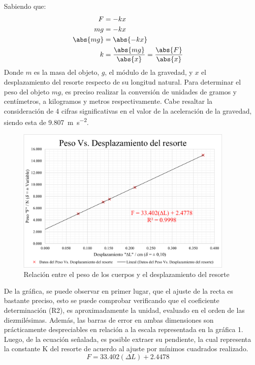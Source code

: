 \documentclass[../main.tex]{subfiles}
\begin{document}
Sabiendo que:
\begin{align*}
  F &= -kx \\
  mg &= -kx \\
  \abs{mg} &= \abs{-kx} \\
  k &= \frac{\abs{mg}}{\abs{x}} = \frac{\abs{F}}{\abs{x}}
\end{align*}
Donde $m$ es la masa del objeto, $g$, el módulo de la gravedad, y $x$ el desplazamiento del resorte respecto de su longitud natural.
Para determinar el peso del objeto $mg$, es preciso realizar la conversión de unidades de gramos y centímetros, a kilogramos y metros respectivamente.
Cabe resaltar la consideración de 4 cifras significativas en el valor de la aceleración de la gravedad, siendo esta de \qty{9,807}{\metre\per\second\squared}.
\begin{figure}
  \begin{center}
    \includegraphics[width=0.95\textwidth]{resources/resl1.png}
  \end{center}
  \caption{Relación entre el peso de los cuerpos y el desplazamiento del resorte}
  \label{fig:weightdisplacement}
\end{figure}
De la gráfica, se puede observar en primer lugar, que el ajuste de la recta es bastante preciso, esto se puede comprobar verificando que el coeficiente determinación (R2), es aproximadamente la unidad, evaluado en el orden de las diezmilésimas.
Además, las barras de error en ambas dimensiones son prácticamente despreciables en relación a la escala representada en la gráfica 1.
Luego, de la ecuación señalada, es posible extraer su pendiente, la cual representa la constante K del resorte de acuerdo al ajuste por mínimos cuadrados realizado.
\begin{equation}
  \label{eq:forceFromSlope}
  F = \num{33.402} (\Delta L) + \num{2.4478}
\end{equation}
\end{document}
